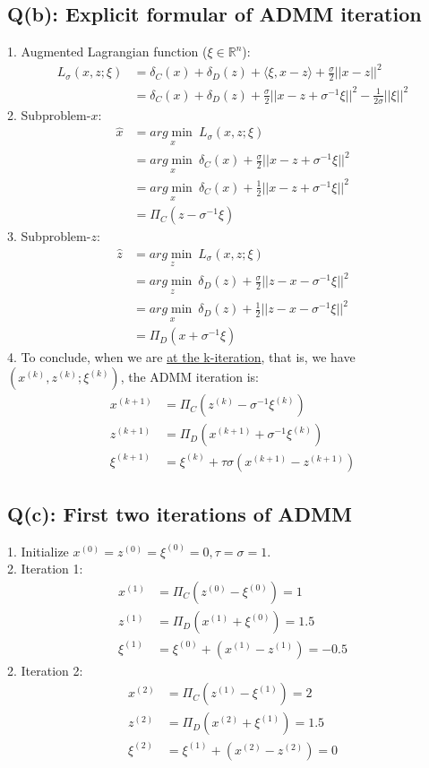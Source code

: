 \documentclass{article}
\begin{document}
\subsection{Q(b): Explicit formular of ADMM iteration}
1. Augmented Lagrangian function ($\xi \in \mathbb{R}^n$):
\begin{align}
	\nonumber
	L_{\sigma}(x,z;\xi) & =\delta_C(x) + \delta_D(z) + \langle \xi, x-z \rangle + \frac{\sigma}{2}||x-z||^2 \\
	\nonumber
	& =\delta_C(x) + \delta_D(z)  + \frac{\sigma}{2}||x-z + \sigma^{-1}\xi||^2 - \frac{1}{2\sigma}||\xi||^2
\end{align}
2. Subproblem-$x$:
\begin{align}
	\nonumber
	\hat{x} &= \underset{x}{arg \min} \ L_{\sigma}(x, z;\xi) \\
	\nonumber
	&=\underset{x}{arg \min}\  \delta_C(x) + \frac{\sigma}{2}||x-z + \sigma^{-1}\xi||^2 \\
	\nonumber
	&=\underset{x}{arg \min}\  \delta_C(x) + \frac{1}{2}||x-z + \sigma^{-1}\xi||^2 \\
	\nonumber
	&= \Pi_C(z-\sigma^{-1}\xi)
\end{align} 
3. Subproblem-$z$:
\begin{align}
	\nonumber
	\hat{z} &= \underset{z}{arg \min} \ L_{\sigma}(x, z;\xi) \\
	\nonumber
	&=\underset{z}{arg \min}\  \delta_D(z) + \frac{\sigma}{2}||z-x- \sigma^{-1}\xi||^2 \\
	\nonumber
	&=\underset{x}{arg \min}\  \delta_D(z) + \frac{1}{2}||z-x- \sigma^{-1}\xi||^2 \\
	\nonumber
	&= \Pi_D(x+\sigma^{-1}\xi)
\end{align} 
4. To conclude, when we are \underline{at the k-iteration}, that is, we have $(x^{(k)}, z^{(k)}; \xi^{(k)} )$, the ADMM iteration is:
\begin{align}
	\nonumber
	x^{(k+1)} &= \Pi_C(z^{(k)}-\sigma^{-1}\xi^{(k)}) \\
	\nonumber
	z^{(k+1)} &=\Pi_D(x^{(k+1)}+\sigma^{-1}\xi^{(k)})\\
	\nonumber
	\xi^{(k+1) } & =\xi^{(k)} +\tau \sigma (x^{(k+1)} - z^{(k+1)})
\end{align}
\subsection{Q(c): First two iterations of ADMM}
1. Initialize $x^{(0)}=z^{(0)}=\xi^{(0)}=0, \tau=\sigma=1$.
\\
2. Iteration 1: 
\begin{align}
	\nonumber
	x^{(1)} &= \Pi_C(z^{(0)}-\xi^{(0)}) =  1\\
	\nonumber
	z^{(1)} &=\Pi_D(x^{(1)}+\xi^{(0)}) =1.5\\
	\nonumber
	\xi^{(1) } & =\xi^{(0)} +(x^{(1)} - z^{(1)})=-0.5
\end{align}
2. Iteration 2:
\begin{align}
	\nonumber
	x^{(2)} &= \Pi_C(z^{(1)}-\xi^{(1)}) =  2\\
	\nonumber
	z^{(2)} &=\Pi_D(x^{(2)}+\xi^{(1)}) =1.5\\
	\nonumber
	\xi^{(2) } & =\xi^{(1)} +(x^{(2)} - z^{(2)})=0
\end{align}
\end{document}
